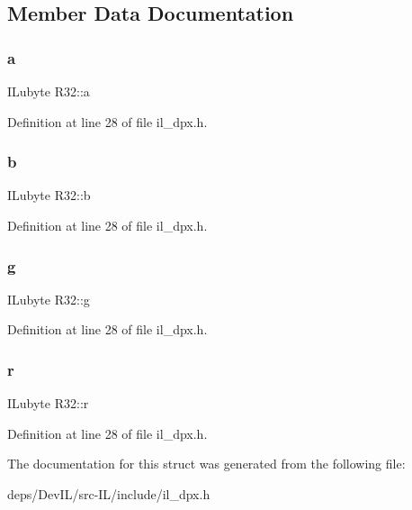 \subsection{Member Data Documentation}
\mbox{\label{structR32_af9b9229864bdb5be6de654f86b7e31ee}} 
\subsubsection{\texorpdfstring{a}{a}}
{\footnotesize\ttfamily I\+Lubyte R32\+::a}



Definition at line 28 of file il\+\_\+dpx.\+h.

\mbox{\label{structR32_a464947e51b69de6ab6070ba7d748c413}} 
\subsubsection{\texorpdfstring{b}{b}}
{\footnotesize\ttfamily I\+Lubyte R32\+::b}



Definition at line 28 of file il\+\_\+dpx.\+h.

\mbox{\label{structR32_a927c4a9c0d65e633d72ad2acdb768c3f}} 
\subsubsection{\texorpdfstring{g}{g}}
{\footnotesize\ttfamily I\+Lubyte R32\+::g}



Definition at line 28 of file il\+\_\+dpx.\+h.

\mbox{\label{structR32_a6da0ff03dce0d2ce04eb18ddc417dae4}} 
\subsubsection{\texorpdfstring{r}{r}}
{\footnotesize\ttfamily I\+Lubyte R32\+::r}



Definition at line 28 of file il\+\_\+dpx.\+h.



The documentation for this struct was generated from the following file\+:\begin{DoxyCompactItemize}
\item 
deps/\+Dev\+I\+L/src-\/\+I\+L/include/il\+\_\+dpx.\+h\end{DoxyCompactItemize}
